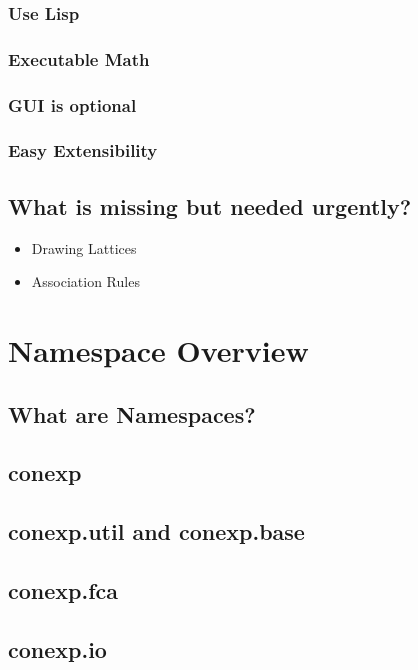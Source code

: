 \documentclass{scrbook}
\begin{document}
    \subsection{Use Lisp}

    \subsection{Executable Math}

    \subsection{GUI is optional}

    \subsection{Easy Extensibility}

  \section{What is missing but needed urgently?}
  \begin{itemize}
    \item Drawing Lattices
    \item Association Rules
  \end{itemize}


\chapter{Namespace Overview}

  \section{What are Namespaces?}

  \section{conexp}

  \section{conexp.util and conexp.base}

  \section{conexp.fca}

  \section{conexp.io}
\end{document}
